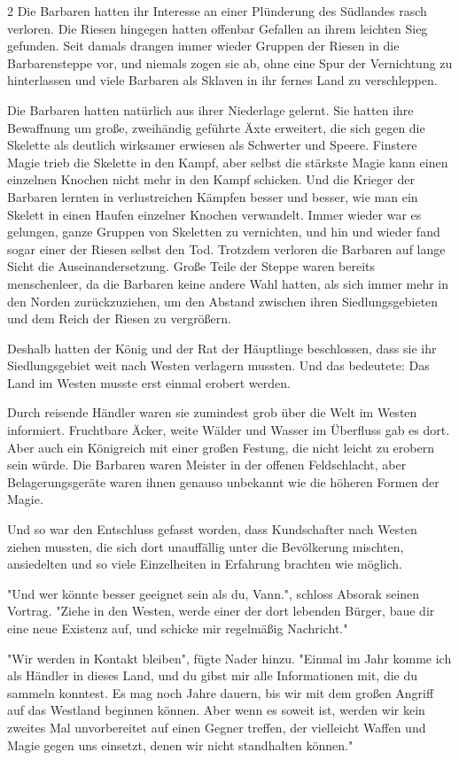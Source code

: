 \documentclass[10pt, a4paper, oneside]{book}
\begin{document}
\begin{multicols}{2}
Die Barbaren hatten ihr Interesse an einer Plünderung des Südlandes rasch verloren. Die Riesen hingegen hatten offenbar Gefallen an ihrem leichten Sieg gefunden. Seit damals drangen immer wieder Gruppen der Riesen in die Barbarensteppe vor, und niemals zogen sie ab, ohne eine Spur der Vernichtung zu hinterlassen und viele Barbaren als Sklaven in ihr fernes Land zu verschleppen.

Die Barbaren hatten natürlich aus ihrer Niederlage gelernt. Sie hatten ihre Bewaffnung um große, zweihändig geführte Äxte erweitert, die sich gegen die Skelette als deutlich wirksamer erwiesen als Schwerter und Speere. Finstere Magie trieb die Skelette in den Kampf, aber selbst die stärkste Magie kann einen einzelnen Knochen nicht mehr in den Kampf schicken. Und die Krieger der Barbaren lernten in verlustreichen Kämpfen besser und besser, wie man ein Skelett in einen Haufen einzelner Knochen verwandelt. Immer wieder war es gelungen, ganze Gruppen von Skeletten zu vernichten, und hin und wieder fand sogar einer der Riesen selbst den Tod. Trotzdem verloren die Barbaren auf lange Sicht die Auseinandersetzung. Große Teile der Steppe waren bereits menschenleer, da die Barbaren keine andere Wahl hatten, als sich immer mehr in den Norden zurückzuziehen, um den Abstand zwischen ihren Siedlungsgebieten und dem Reich der Riesen zu vergrößern.

Deshalb hatten der König und der Rat der Häuptlinge beschlossen, dass sie ihr Siedlungsgebiet weit nach Westen verlagern mussten. Und das bedeutete: Das Land im Westen musste erst einmal erobert werden.

Durch reisende Händler waren sie zumindest grob über die Welt im Westen informiert. Fruchtbare Äcker, weite Wälder und Wasser im Überfluss gab es dort. Aber auch ein Königreich mit einer großen Festung, die nicht leicht zu erobern sein würde. Die Barbaren waren Meister in der offenen Feldschlacht, aber Belagerungsgeräte waren ihnen genauso unbekannt wie die höheren Formen der Magie.

Und so war den Entschluss gefasst worden, dass Kundschafter nach Westen ziehen mussten, die sich dort unauffällig unter die Bevölkerung mischten, ansiedelten und so viele Einzelheiten in Erfahrung brachten wie möglich.

"Und wer könnte besser geeignet sein als du, Vann.", schloss Absorak seinen Vortrag. "Ziehe in den Westen, werde einer der dort lebenden Bürger, baue dir eine neue Existenz auf, und schicke mir regelmäßig Nachricht."

"Wir werden in Kontakt bleiben", fügte Nader hinzu. "Einmal im Jahr komme ich als Händler in dieses Land, und du gibst mir alle Informationen mit, die du sammeln konntest. Es mag noch Jahre dauern, bis wir mit dem großen Angriff auf das Westland beginnen können. Aber wenn es soweit ist, werden wir kein zweites Mal unvorbereitet auf einen Gegner treffen, der vielleicht Waffen und Magie gegen uns einsetzt, denen wir nicht standhalten können."


\end{multicols}
\end{document}
